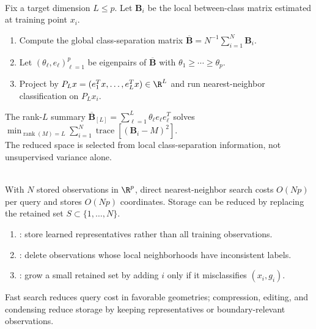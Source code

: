 \begin{method} \label{meth:sl-global-dimension-reduction-nearest-neighbor} \\
Fix a target dimension $L\leq p$.  Let $\mathbf{B}_i$ be the local between-class matrix estimated at training point $x_i$.
\begin{enumerate}[label=(\roman*)]
\setlength{\itemsep}{0pt}
\item Compute the global class-separation matrix $\overline{\mathbf{B}}=N^{-1}\sum_{i=1}^N\mathbf{B}_i$.
\item Let $(\theta_\ell,e_\ell)_{\ell=1}^p$ be eigenpairs of $\overline{\mathbf{B}}$ with $\theta_1\geq\cdots\geq\theta_p$.
\item Project by $P_Lx=(e_1^Tx,\ldots,e_L^Tx)\in\R^L$ and run nearest-neighbor classification on $P_Lx_i$.
\end{enumerate}
The rank-$L$ summary $\overline{\mathbf{B}}_{[L]}=\sum_{\ell=1}^L\theta_\ell e_\ell e_\ell^T$ solves $\min_{\operatorname{rank}(M)=L}\sum_{i=1}^N\operatorname{trace}[(\mathbf{B}_i-M)^2]$.\\
The reduced space is selected from local class-separation information, not unsupervised variance alone.
\end{method}

\begin{remark} \label{rem:sl-nearest-neighbor-computation-and-storage} \\
With $N$ stored observations in $\R^p$, direct nearest-neighbor search costs $O(Np)$ per query and stores $O(Np)$ coordinates.  Storage can be reduced by replacing the retained set $S\subset\{1,\ldots,N\}$.
\begin{enumerate}[label=(\roman*)]
\setlength{\itemsep}{0pt}
\item {}: store learned representatives rather than all training observations.
\item {}: delete observations whose local neighborhoods have inconsistent labels.
\item {}: grow a small retained set by adding $i$ only if it misclassifies $(x_i,g_i)$.
\end{enumerate}
Fast search reduces query cost in favorable geometries; compression, editing, and condensing reduce storage by keeping representatives or boundary-relevant observations.
\end{remark}
